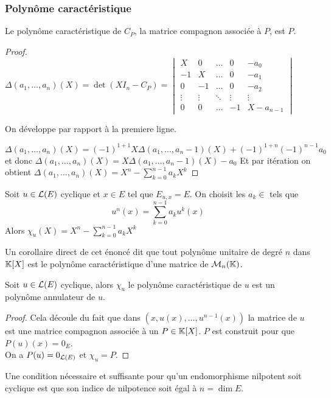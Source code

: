 \subsubsection{Polynôme caractéristique }

\begin{prop}
	Le polynôme caractéristique de $C_P$, la matrice compagnon associée à $P$, est $P$.
\end{prop}

\begin{proof}
	$\Delta(a_1, \ldots, a_n)(X) = \det (XI_n - C_P) =
		\begin{vmatrix}
			X      & 0      & \ldots & 0      & -a_0      \\
			-1     & X      & \ldots & 0      & -a_1      \\
			0      & -1     & \ldots & 0      & -a_2      \\
			\vdots & \vdots & \ddots & \vdots & \vdots    \\
			0      & 0      & \ldots & -1     & X-a_{n-1}
		\end{vmatrix}$

	On développe par rapport à la premiere ligne.

	$$ \Delta(a_1, \ldots, a_n)(X) = (-1)^{1+1}X\Delta(a_1, \ldots, a_n-1)(X) + (-1)^{1+n}(-1)^{n-1}a_0$$
	et donc $\Delta(a_1, \ldots, a_n)(X) = X\Delta(a_1, \ldots, a_n-1)(X) - a_0 $
	Et par itération on obtient $\Delta(a_1, \ldots, a_n)(X) = X^n - \sum_{k=0}^{n-1} a_k X^k$
\end{proof}



\begin{prop}
	Soit $u \in \mathcal{L}(E)$ cyclique et $x \in E$ tel que $E_{u,x} = E$. On choisit les $a_k \in $ tels que
	$$u^n(x) = \sum_{k=0}^{n-1} a_k u^k(x)$$
	Alors $\chi_u (X) = X^n - \sum_{k=0}^{n-1} a_k X^k$
\end{prop}

\begin{remarque}
	Un corollaire direct de cet énoncé dit que tout polynôme unitaire de degré $n$ dans $\mathbb{K}[X]$ est le polynôme caractéristique
	d'une matrice de $\mathcal{M}_n(\mathbb{K})$.
\end{remarque}

\begin{theorem}
	Soit $u \in \mathcal{L}(E)$ cyclique, alors $\chi_u $ le polynôme caractéristique de $u$ est un
	polynôme annulateur de $u$.
\end{theorem}

\begin{proof}
	Cela découle du fait que dans $(x, u(x), \ldots, u^{n-1}(x))$ la matrice de $u$ est une matrice compagnon associée à un $P \in \mathbb{K}[X]$.
	$P$ est construit pour que $P(u)(x) = 0_E$.\\
	On a $P(u) = 0_{\mathcal{L}(E)}$ et $\chi_u = P$.
\end{proof}


\begin{example}
	Une condition nécessaire et suffisante pour qu'un endomorphisme nilpotent soit cyclique est
	que son indice de nilpotence soit égal à $n = \dim E$.
\end{example}
